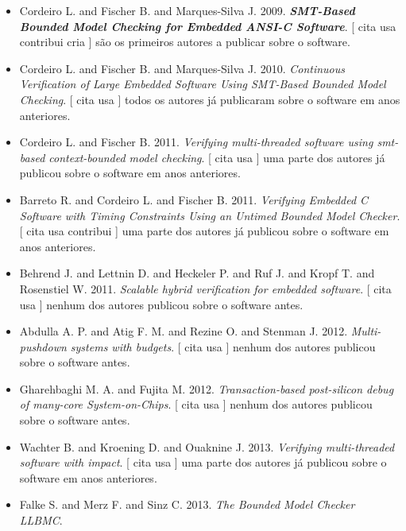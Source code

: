 \begin{itemize}
\item Cordeiro L. and Fischer B. and Marques-Silva J.
      2009.
        \textbf{\textit{ SMT-Based Bounded Model Checking for Embedded ANSI-C Software}}.
      [
          cita
          usa
          contribui
          cria
      ]
são os primeiros autores a publicar sobre o software.
\item Cordeiro L. and Fischer B. and Marques-Silva J.
      2010.
        \textit{ Continuous Verification of Large Embedded Software Using SMT-Based Bounded Model Checking}.
      [
          cita
          usa
      ]
todos os autores já publicaram sobre o software em anos anteriores.
\item Cordeiro L. and Fischer B.
      2011.
        \textit{ Verifying multi-threaded software using smt-based context-bounded model checking}.
      [
          cita
          usa
      ]
uma parte dos autores já publicou sobre o software em anos anteriores.
\item Barreto R. and Cordeiro L. and Fischer B.
      2011.
        \textit{ Verifying Embedded C Software with Timing Constraints Using an Untimed Bounded Model Checker}.
      [
          cita
          usa
          contribui
      ]
uma parte dos autores já publicou sobre o software em anos anteriores.
\item Behrend J. and Lettnin D. and Heckeler P. and Ruf J. and Kropf T. and Rosenstiel W.
      2011.
        \textit{ Scalable hybrid verification for embedded software}.
      [
          cita
          usa
      ]
nenhum dos autores publicou sobre o software antes.
\item Abdulla A. P. and Atig F. M. and Rezine O. and Stenman J.
      2012.
        \textit{ Multi-pushdown systems with budgets}.
      [
          cita
          usa
      ]
nenhum dos autores publicou sobre o software antes.
\item Gharehbaghi M. A. and Fujita M.
      2012.
        \textit{ Transaction-based post-silicon debug of many-core System-on-Chips}.
      [
          cita
          usa
      ]
nenhum dos autores publicou sobre o software antes.
\item Wachter B. and Kroening D. and Ouaknine J.
      2013.
        \textit{ Verifying multi-threaded software with impact}.
      [
          cita
          usa
      ]
uma parte dos autores já publicou sobre o software em anos anteriores.
\item Falke S. and Merz F. and Sinz C.
      2013.
        \textit{ The Bounded Model Checker LLBMC}.

\end{itemize}
